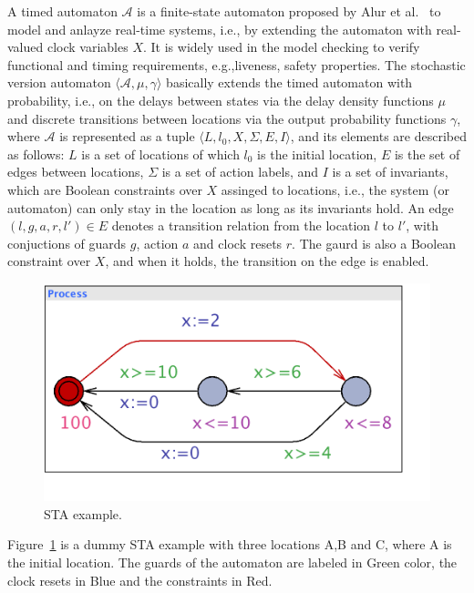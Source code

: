 A timed automaton $\mathcal{A}$ is a finite-state automaton proposed by Alur et al.~\cite{Alur1999TimedAutomata} to model and anlayze real-time systems, i.e., by extending the automaton with real-valued clock variables $X$. It is widely used in the model checking to verify functional and timing requirements, e.g.,liveness, safety properties. The stochastic version automaton $\langle\mathcal{A},\mu,\gamma\rangle$ basically extends the timed automaton with probability, i.e., on the delays between states via the delay density functions $\mu$ and discrete transitions between locations via the output probability functions $\gamma$, where  $\mathcal{A}$ is represented as a tuple $\langle L,l_0,X,\Sigma,E,I\rangle$, and its elements are described as follows: $L$ is a set of locations of which $l_0$ is the initial location, $E$ is the set of edges between locations,  $\Sigma$ is a set of action labels, and $I$ is a set of invariants, which are Boolean constraints over $X$ assinged to locations, i.e., the system (or automaton) can only stay in the location as long as its invariants hold. An edge $(l,g,a,r,l')\in E$ denotes a transition relation from the location $l$ to $l'$, with conjuctions of guards $g$, action $a$ and clock resets $r$. The gaurd is also a Boolean constraint over $X$, and when it holds, the transition on the edge is enabled.
\begin{figure}
	\centering
	\includegraphics[width=0.6\linewidth]{images/sta_dummy_example}
	\caption{STA example.}
	\label{fig_staexample}
\end{figure}

\begin{example} Figure~\ref{fig_staexample} is a dummy STA example with three locations A,B and C, where A is the initial location. The guards of the automaton are labeled in Green color, the clock resets in Blue and the constraints in Red.
\end{example}

